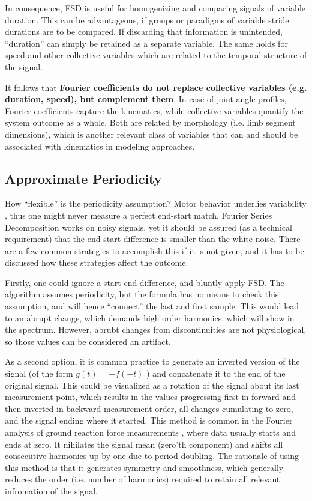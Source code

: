 In consequence, FSD is useful for homogenizing and comparing signals of variable duration.
This can be advantageous, if groups or paradigms of variable stride durations are to be compared.
If discarding that information is unintended, ``duration'' can simply be retained as a separate variable.
The same holds for speed and other collective variables which are related to the temporal structure of the signal.

It follows that \textbf{Fourier coefficients do not replace collective variables (e.g. duration, speed), but complement them}.
In case of joint angle profiles, Fourier coefficients capture the kinematics, while collective variables quantify the system outcome as a whole.
Both are related by morphology (i.e. limb segment dimensions), which is another relevant class of variables that can and should be associated with kinematics in modeling approaches.


\subsection{Approximate Periodicity}
\label{properties:endstart}
How ``flexible'' is the periodicity assumption?
Motor behavior underlies variability \citep{Bernstein1935}, thus one might never measure a perfect end-start match.
Fourier Series Decomposition works on noisy signals, yet it should be assured (as a technical requirement) that the end-start-difference is smaller than the white noise.
There are a few common strategies to accomplish this if it is not given, and it has to be discussed how these strategies affect the outcome.



Firstly, one could ignore a start-end-difference, and bluntly apply FSD.
The algorithm assumes periodicity, but the formula has no means to check this assumption, and will hence ``connect'' the last and first sample.
This would lead to an abrupt change, which demands high order harmonics, which will show in the spectrum.
However, abrubt changes from discontinuities are not physiological, so those values can be considered an artifact.


As a second option, it is common practice to generate an inverted version of the signal (of the form \(g(t) = -f(-t)\) ) and concatenate it to the end of the original signal.
This could be visualized as a rotation of the signal about its last measurement point, which results in the values progressing first in forward and then inverted in backward measurement order, all changes cumulating to zero, and the signal ending where it started.
This method is common in the Fourier analysis of ground reaction force measurements \citep{Schneider1983,Alexander1980}, where data usually starts and ends at zero.
It nihilates the signal mean (zero'th component) and shifts all consecutive harmonics up by one due to period doubling.
The rationale of using this method is that it generates symmetry and smoothness, which generally reduces the order (i.e. number of harmonics) required to retain all relevant infromation of the signal.


